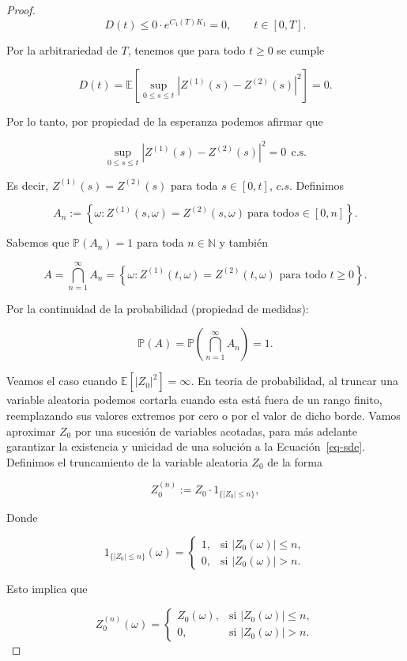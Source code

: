 \documentclass[
  spanish,
  us-letterpaper,
]{scrreprt}
\theoremstyle{plain}
\theoremstyle{plain}
\theoremstyle{definition}
\theoremstyle{plain}
\theoremstyle{remark}
\begin{document}
\begin{proof}
\[
    D(t) \leq 0\cdot e^{C_1(T)K_1}=0, \qquad t\in [0,T].
\]

Por la arbitrariedad de \(T\), tenemos que para todo \(t\geq 0\) se
cumple

\[
    D(t)=\mathbb{E}\left[\sup\limits_{0\leq s\leq t}\left|Z^{(1)}(s) - Z^{(2)}(s)\right|^2\right]=0.
\]

Por lo tanto, por propiedad de la esperanza podemos afirmar que

\[
\sup\limits_{0\leq s\leq t}\left|Z^{(1)}(s) - Z^{(2)}(s)\right|^2=0\ \ \text{c.s.}
\]

Es decir, \(Z^{(1)}(s)=Z^{(2)}(s)\) para toda \(s\in [0,t]\), \(c.s\).
Definimos

\[
A_n:=\left\{\omega: Z^{(1)}(s,\omega)=Z^{(2)}(s,\omega)\ \text{para todo} s\in [0,n]\right\}.
\]

Sabemos que \(\mathbb{P}(A_n)=1\) para toda \(n\in \mathbb{N}\) y
también

\[
    A = \bigcap_{n=1}^\infty A_n = \left\{ \omega : Z^{(1)}(t,\omega) = Z^{(2)}(t,\omega) \text{ para todo } t \geq 0 \right\}.
\]

Por la continuidad de la probabilidad (propiedad de medidas):

\[
\mathbb{P}(A) = \mathbb{P}\left( \bigcap_{n=1}^\infty A_n \right) = 1.
\]

Veamos el caso cuando \(\mathbb{E}[|Z_0|^2]=\infty\). En teoria de
probabilidad, al truncar una variable aleatoria podemos cortarla cuando
esta está fuera de un rango finito, reemplazando sus valores extremos
por cero o por el valor de dicho borde. Vamos aproximar \(Z_0\) por una
sucesión de variables acotadas, para más adelante garantizar la
existencia y unicidad de una solución a la Ecuación~\ref{eq-sde}.
Definimos el truncamiento de la variable aleatoria \(Z_0\) de la forma

\[
    Z_0^{(n)}:=Z_0\cdot 1_{\{|Z_0|\leq n\}},
\]

Donde

\[
1_{\{ |Z_0| \leq n \}}(\omega) =
\begin{cases}
1, & \text{si } |Z_0(\omega)| \leq n, \\
0, & \text{si } |Z_0(\omega)| > n.
\end{cases}
\]

Esto implica que

\[
    Z_0^{(n)}(\omega) = 
    \begin{cases}
    Z_0(\omega), & \text{si } |Z_0(\omega)| \leq n, \\ 
    0, & \text{si } |Z_0(\omega)| > n.
    \end{cases}
\]


\end{proof}
\end{document}
